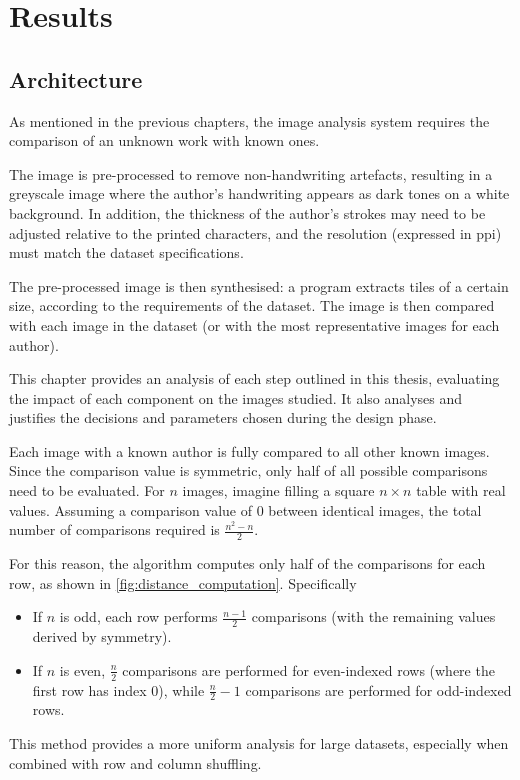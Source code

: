 \chapter{Results}
\begin{toReview}
\section{Architecture}
	As mentioned in the previous chapters, the image analysis system requires the comparison of an unknown work with known ones.

	\noindent The image is pre-processed to remove non-handwriting artefacts, resulting in a greyscale image where the author's handwriting appears as dark tones on a white background. In addition, the thickness of the author's strokes may need to be adjusted relative to the printed characters, and the resolution (expressed in \gls{ppi}) must match the dataset specifications.

	\noindent The pre-processed image is then synthesised: a program extracts tiles of a certain size, according to the requirements of the dataset. The image is then compared with each image in the dataset (or with the most representative images for each author).

	\noindent This chapter provides an analysis of each step outlined in this thesis, evaluating the impact of each component on the images studied. It also analyses and justifies the decisions and parameters chosen during the design phase.

	\bigskip
	\noindent Each image with a known author is fully compared to all other known images. Since the comparison value is symmetric, only half of all possible comparisons need to be evaluated. For $n$ images, imagine filling a square $n\times n$ table with real values. Assuming a comparison value of $0$ between identical images, the total number of comparisons required is $\frac{n^2-n}{2}$.

	\noindent For this reason, the algorithm computes only half of the comparisons for each row, as shown in \cref{fig:distance_computation}. Specifically
	\begin{itemize}
		\item If $n$ is odd, each row performs $\frac{n-1}{2}$ comparisons (with the remaining values derived by symmetry).
		\item If $n$ is even, $\frac{n}2$ comparisons are performed for even-indexed rows (where the first row has index $0$), while $\frac{n}2-1$ comparisons are performed for odd-indexed rows.
	\end{itemize}
	\noindent This method provides a more uniform analysis for large datasets, especially when combined with row and column shuffling.


\end{toReview}
